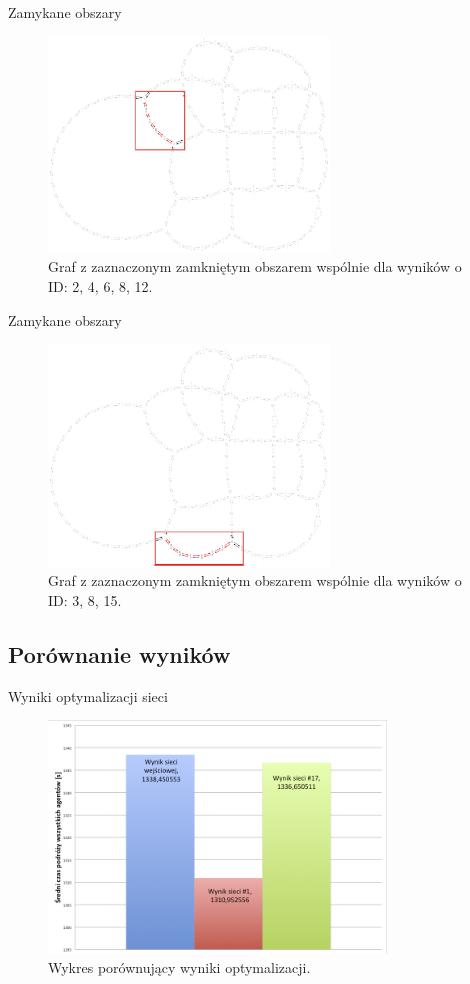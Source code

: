 \documentclass{beamer}
\begin{document}
\begin{frame}{Zamykane obszary} 
\begin{figure}[b]
\includegraphics[width=0.666\textwidth]{img/wspolne4}
\caption{Graf z zaznaczonym zamkniętym obszarem wspólnie dla wyników o ID: 2, 4, 6, 8, 12.}
\end{figure}
\end{frame}

\begin{frame}{Zamykane obszary} 
\begin{figure}[b]
\includegraphics[width=0.666\textwidth]{img/wspolne2}
\caption{Graf z zaznaczonym zamkniętym obszarem wspólnie dla wyników o ID: 3, 8, 15.}
\end{figure}
\end{frame}

\subsection{Porównanie wyników}
\begin{frame}{Wyniki optymalizacji sieci} 
\begin{figure}[b]
\includegraphics[width=0.8\textwidth]{img/wyniki}
\caption{Wykres porównujący wyniki optymalizacji.}
\end{figure}
\end{frame}
\end{document}
